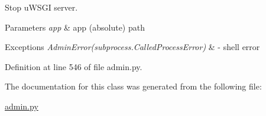 Stop u\-W\-S\-G\-I server. 


\begin{DoxyParams}{Parameters}
{\em app} & app (absolute) path \\
\hline
\end{DoxyParams}

\begin{DoxyExceptions}{Exceptions}
{\em Admin\-Error(subprocess.\-Called\-Process\-Error)} & -\/ shell error \\
\hline
\end{DoxyExceptions}


Definition at line 546 of file admin.\-py.



The documentation for this class was generated from the following file\-:\begin{DoxyCompactItemize}
\item 
\hyperlink{admin_8py}{admin.\-py}\end{DoxyCompactItemize}
